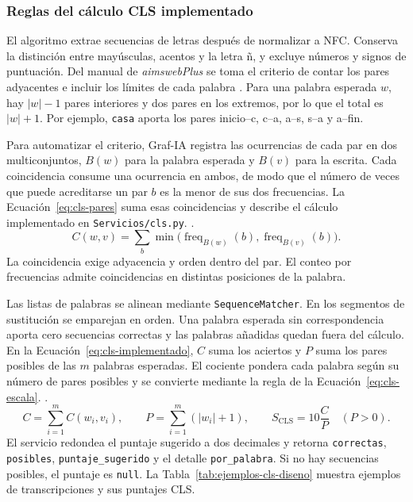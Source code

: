 \subsubsection{Reglas del cálculo CLS implementado}
\label{sec:diseno-cls}
El algoritmo extrae secuencias de letras después de normalizar a NFC. Conserva la distinción entre mayúsculas, acentos y la letra ñ, y excluye números y signos de puntuación. Del manual de \textit{aimswebPlus} se toma el criterio de contar los pares adyacentes e incluir los límites de cada palabra \cite[pp.~62--63]{aimswebplus2025manual}. Para una palabra esperada $w$, hay $|w|-1$ pares interiores y dos pares en los extremos, por lo que el total es $|w|+1$. Por ejemplo, \texttt{casa} aporta los pares inicio--c, c--a, a--s, s--a y a--fin.

Para automatizar el criterio, Graf-IA registra las ocurrencias de cada par en dos multiconjuntos, $B(w)$ para la palabra esperada y $B(v)$ para la escrita. Cada coincidencia consume una ocurrencia en ambos, de modo que el número de veces que puede acreditarse un par $b$ es la menor de sus dos frecuencias. La Ecuación~\eqref{eq:cls-pares} suma esas coincidencias y describe el cálculo implementado en \texttt{Servicios/cls.py}.
\cite{aimswebplus2025manual}.
\begin{equation}
 C(w,v)=\sum_b \min\bigl(\operatorname{freq}_{B(w)}(b),
                            \operatorname{freq}_{B(v)}(b)\bigr).
 \label{eq:cls-pares}
\end{equation}
La coincidencia exige adyacencia y orden dentro del par. El conteo por frecuencias admite coincidencias en distintas posiciones de la palabra.

Las listas de palabras se alinean mediante \texttt{SequenceMatcher}. En los segmentos de sustitución se emparejan en orden. Una palabra esperada sin correspondencia aporta cero secuencias correctas y las palabras añadidas quedan fuera del cálculo. En la Ecuación~\eqref{eq:cls-implementado}, $C$ suma los aciertos y $P$ suma los pares posibles de las $m$ palabras esperadas. El cociente pondera cada palabra según su número de pares posibles y se convierte mediante la regla de la Ecuación~\eqref{eq:cls-escala}.
\cite{aimswebplus2025manual}.
\begin{equation}
 C=\sum_{i=1}^{m}C(w_i,v_i),\qquad
 P=\sum_{i=1}^{m}(|w_i|+1),\qquad
 S_{\mathrm{CLS}}=10\frac{C}{P}\quad(P>0).
 \label{eq:cls-implementado}
\end{equation}
El servicio redondea el puntaje sugerido a dos decimales y retorna \texttt{correctas}, \texttt{posibles}, \texttt{puntaje\_sugerido} y el detalle \texttt{por\_palabra}. Si no hay secuencias posibles, el puntaje es \texttt{null}. La Tabla~\ref{tab:ejemplos-cls-diseno} muestra ejemplos de transcripciones y sus puntajes CLS.

